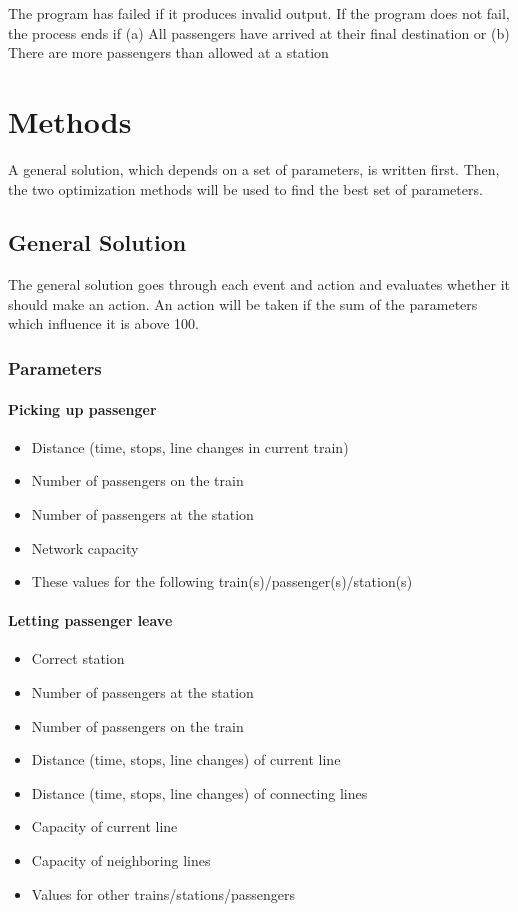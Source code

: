 \documentclass[10pt]{report}
\begin{document}
The program has failed if it produces invalid output. If the program does not fail, the process ends if
(a)	All passengers have arrived at their final destination
or
(b)	There are more passengers than allowed at a station


\chapter{Methods}

A general solution, which depends on a set of parameters, is written first. Then, the two optimization methods will be used to find the best set of parameters.


\section{General Solution}
The general solution goes through each event and action and evaluates whether it should make an action. An action will be taken if the sum of the parameters which influence it is above 100.

\subsection{Parameters}

\subsubsection{Picking up passenger}
\begin{itemize}
    \item Distance (time, stops, line changes in current train)
    \item Number of passengers on the train
    \item Number of passengers at the station
    \item Network capacity
    \item These values for the following train(s)/passenger(s)/station(s)
\end{itemize}

\subsubsection{Letting passenger leave}
\begin{itemize}
    \item Correct station
    \item Number of passengers at the station
    \item Number of passengers on the train
    \item Distance (time, stops, line changes) of current line
    \item Distance (time, stops, line changes) of connecting lines
    \item Capacity of current line
    \item Capacity of neighboring lines
    \item Values for other trains/stations/passengers
\end{itemize}
\end{document}
